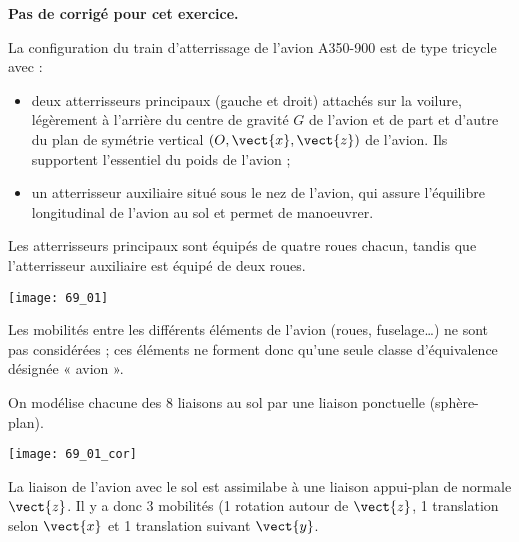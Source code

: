 \normaltrue \difficilefalse \tdifficilefalse
\correctiontrue

\exer{ $\star$ \label{B2:16:69}}
\setcounter{question}{0}


\ifcorrection
\else
\textbf{Pas de corrigé pour cet exercice.}
\fi

\ifprof
\else
La configuration du train d’atterrissage de l’avion A350-900 est de type tricycle avec :
\begin{itemize}
\item deux atterrisseurs principaux (gauche et droit) attachés sur la voilure, légèrement à
l’arrière du centre de gravité $G$ de l’avion et de part et d’autre du plan de symétrie
vertical $\left(O, \vect{x}, \vect{z}\right)$ de l'avion. Ils supportent l’essentiel du poids de l’avion ;
\item un atterrisseur auxiliaire situé sous le nez de l’avion, qui assure l’équilibre longitudinal
de l’avion au sol et permet de manoeuvrer.
\end{itemize}
Les atterrisseurs principaux sont équipés de quatre roues chacun, tandis que
l’atterrisseur auxiliaire est équipé de deux roues.



\begin{center}
\texttt{[image: 69\_01]}
\end{center}

Les mobilités entre les différents éléments de l’avion (roues,
fuselage…) ne sont pas considérées ; ces éléments ne forment donc qu’une seule
classe d’équivalence désignée « avion ».

\fi

On modélise chacune des 8 liaisons au sol par une liaison ponctuelle (sphère-plan).
\ifprof
\begin{center}
\texttt{[image: 69\_01\_cor]}
\end{center}
\else 
\fi

\ifprof
La liaison de l'avion avec le sol est assimilabe à une liaison appui-plan de normale $\vect{z}$. Il y a donc 3 mobilités (1 rotation autour de $\vect{z}$, 1 translation selon $\vect{x}$ et 1 translation suivant $\vect{y}$.

